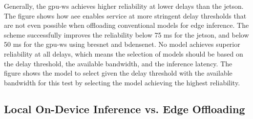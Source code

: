 Generally, the \gls{gpu-ws} achieves higher reliability at lower delays than the \gls{jetson}. The figure shows how \gls{aee} enables service at more stringent delay thresholds that are not even possible when offloading conventional models for edge inference. The scheme successfully improves the reliability below 75 ms for the \gls{jetson}, and below 50 ms for the \gls{gpu-ws} using \gls{bresnet} and \gls{bdensenet}. 
No model achieves superior reliability at all delays, which means the selection of models should be based on the delay threshold, the available bandwidth, and the inference latency. The figure shows the model to select given the delay threshold with the available bandwidth for this test by selecting the model achieving the highest reliability.

\subsection{Local On-Device Inference vs. Edge Offloading}

